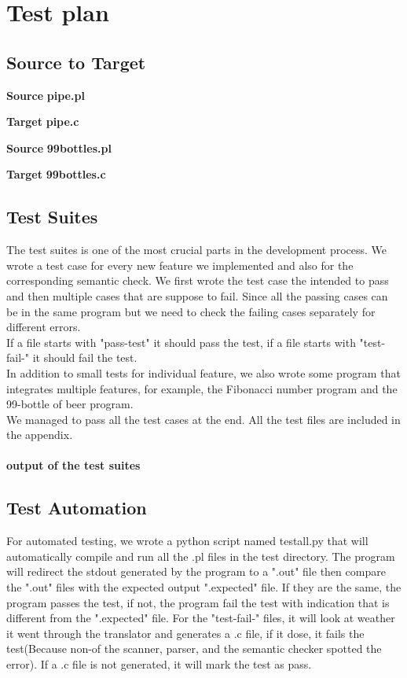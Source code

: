 \documentclass[./Report_main.tex]{subfiles}
\begin{document}


\chapter{Test plan}
\section{Source to Target}
\textbf{Source}
\textbf{pipe.pl}

\textbf{Target}
\textbf{pipe.c}

\textbf{Source}
\textbf{99bottles.pl}

\textbf{Target}
\textbf{99bottles.c}

\section{Test Suites}
The test suites is one of the most crucial parts in the development process. We wrote a test case for every new feature we implemented and also for the corresponding semantic check. We first wrote the test case the intended to pass and then multiple cases that are suppose to fail. Since all the passing cases can be in the same program but we need to check the failing cases separately for different errors.\\
If a file starts with "pass-test" it should pass the test, if a file starts with "test-fail-" it should fail the test.\\
In addition to small tests for individual feature, we also wrote some program that integrates multiple features, for example, the Fibonacci number program and the 99-bottle of beer program.\\
We managed to pass all the test cases at the end. All the test files are included in the appendix.\\
\vspace{5mm}\\
\textbf{output of the test suites}

\section{Test Automation}
For automated testing, we wrote a python script named testall.py that will automatically compile and run all the .pl files in the test directory. The program will redirect the stdout generated by the program to a ".out" file then compare the ".out" files with the expected output ".expected" file. If they are the same, the program passes the test, if not, the program fail the test with indication that is different from the ".expected" file. For the "test-fail-" files, it will look at weather it went through the translator and generates a .c file, if it dose, it fails the test(Because non-of the scanner, parser, and the semantic checker spotted the error). If a .c file is not generated, it will mark the test as pass.\\
\end{document}

